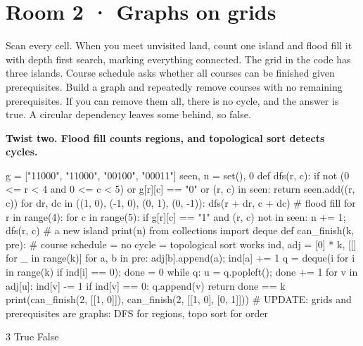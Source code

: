 \documentclass[11pt,a4paper]{report}
\begin{document}
\section*{Room 2 · Graphs on grids}
Scan every cell. When you meet unvisited land, count one island and flood fill it with depth first search, marking everything connected. The grid in the code has three islands. Course schedule asks whether all courses can be finished given prerequisites. Build a graph and repeatedly remove courses with no remaining prerequisites. If you can remove them all, there is no cycle, and the answer is true. A circular dependency leaves some behind, so false.
\begin{tcolorbox}[colback=yellow!12,colframe=orange!70!black,boxrule=0.4pt,left=4pt,right=4pt,top=2pt,bottom=2pt]\textbf{Twist two. Flood fill counts regions, and topological sort detects cycles.}\end{tcolorbox}
\begin{Code}
g = ["11000", "11000", "00100", "00011"]
seen, n = set(), 0
def dfs(r, c):
    if not (0 <= r < 4 and 0 <= c < 5) or g[r][c] == "0" or (r, c) in seen: return
    seen.add((r, c))
    for dr, dc in ((1, 0), (-1, 0), (0, 1), (0, -1)): dfs(r + dr, c + dc)   # flood fill
for r in range(4):
    for c in range(5):
        if g[r][c] == "1" and (r, c) not in seen: n += 1; dfs(r, c)         # a new island
print(n)
from collections import deque
def can_finish(k, pre):                     # course schedule = no cycle = topological sort works
    ind, adj = [0] * k, [[] for _ in range(k)]
    for a, b in pre: adj[b].append(a); ind[a] += 1
    q = deque(i for i in range(k) if ind[i] == 0); done = 0
    while q:
        u = q.popleft(); done += 1
        for v in adj[u]:
            ind[v] -= 1
            if ind[v] == 0: q.append(v)
    return done == k
print(can_finish(2, [[1, 0]]), can_finish(2, [[1, 0], [0, 1]]))
# UPDATE: grids and prerequisites are graphs: DFS for regions, topo sort for order
\end{Code}
\begin{Out}
3
True False
\end{Out}
\end{document}
